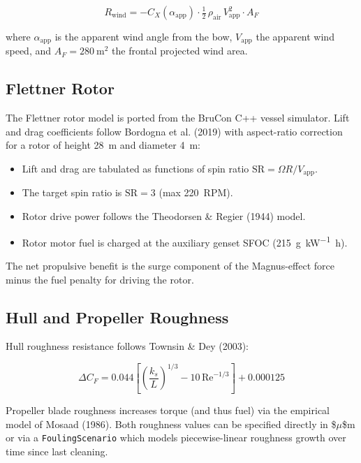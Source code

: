 \documentclass[a4paper,11pt]{article}
\begin{document}
\begin{equation}
  R_\text{wind} = -C_X(\alpha_\text{app}) \cdot \tfrac{1}{2}\,\rho_\text{air}\,
                   V_\text{app}^2 \cdot A_F
\end{equation}

where \(\alpha_\text{app}\) is the apparent wind angle from the bow, \(V_\text{app}\)
the apparent wind speed, and \(A_F = \SI{280}{\metre\squared}\) the frontal
projected wind area.

\subsection{Flettner Rotor}
\label{sec:orgb0af809}

The Flettner rotor model is ported from the BruCon C++ vessel simulator.  Lift
and drag coefficients follow Bordogna et al. (2019) with aspect-ratio correction
for a rotor of height \SI{28}{\metre} and diameter \SI{4}{\metre}:

\begin{itemize}
\item Lift and drag are tabulated as functions of spin ratio \(\text{SR} = \Omega R / V_\text{app}\).
\item The target spin ratio is \(\text{SR} = 3\) (max \SI{220}{RPM}).
\item Rotor drive power follows the Theodorsen \& Regier (1944) model.
\item Rotor motor fuel is charged at the auxiliary genset SFOC (\SI{215}{\gram\per\kilo\watt\hour}).
\end{itemize}

The net propulsive benefit is the surge component of the Magnus-effect force
minus the fuel penalty for driving the rotor.

\subsection{Hull and Propeller Roughness}
\label{sec:org0f7008f}

Hull roughness resistance follows Townsin \& Dey (2003):

\begin{equation}
  \Delta C_F = 0.044 \left[\left(\frac{k_s}{L}\right)^{1/3}
               - 10\,\text{Re}^{-1/3}\right] + 0.000125
\end{equation}

Propeller blade roughness increases torque (and thus fuel) via the empirical
model of Mosaad (1986).  Both roughness values can be specified directly in
\$\(\mu\)\$m or via a \texttt{FoulingScenario} which models piecewise-linear roughness growth
over time since last cleaning.
\end{document}

